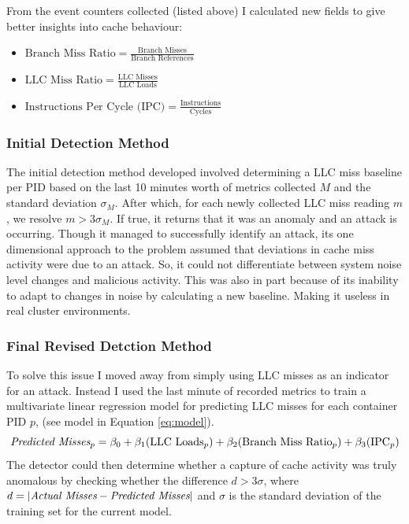 \documentclass[11pt,a4paper, notitlepage]{article}
\begin{document}
From the event counters collected (listed above) I calculated new fields to give better insights into cache behaviour:

\begin{itemize}
    \item $\text{Branch Miss Ratio} = \frac{\text{Branch Misses}}{\text{Branch References}}$
    \item $\text{LLC Miss Ratio} = \frac{\text{LLC Misses}}{\text{LLC Loads}}$
    \item $\text{Instructions Per Cycle (IPC)} = \frac{\text{Instructions}}{\text{Cycles}}$
\end{itemize}

\subsubsection{Initial Detection Method}
The initial detection method developed involved determining a LLC miss baseline per PID based on the last 10 minutes worth of metrics collected $M$ and the standard deviation $\sigma_M$. 
After which, for each newly collected LLC miss reading $m$, we resolve $m > 3\sigma_M$. If true, it returns that it was an anomaly and an attack is occurring.
Though it managed to successfully identify an attack, its one dimensional approach to the problem assumed that  
deviations in cache miss activity were due to an attack. So, it could not differentiate between system noise level changes and malicious activity. 
This was also in part because of its inability to adapt to changes in noise by calculating a new baseline. Making it useless in real cluster environments.

\subsubsection{Final Revised Detction Method}
To solve this issue I moved away from simply using LLC misses as an indicator for an attack. Instead I 
used the last minute of recorded metrics to train a multivariate linear regression model for predicting LLC misses for each container PID $p$, (see model in Equation \ref{eq:model}).
\begin{equation}
    \label{eq:model}
    \emph{Predicted Misses}_{p} = \beta_0 + \beta_1(\text{LLC Loads}_{p}) + \beta_2(\text{Branch Miss Ratio}_{p}) + \beta_3(\text{IPC}_{p})
\end{equation}
The detector could then determine whether a capture of cache activity was truly anomalous by checking whether the difference $d > 3\sigma$, 
where $d = |\emph{Actual Misses} - \emph{Predicted Misses}|$ and $\sigma$ is the standard deviation of the training set for the current model. 
\end{document}
